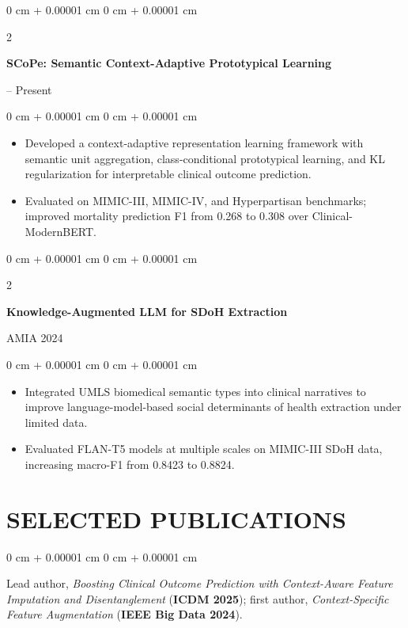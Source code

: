 \documentclass[10pt, letterpaper]{article}
\newenvironment{highlights}{
    \begin{itemize}[
        topsep=0.03 cm,
        parsep=0.03 cm,
        partopsep=0pt,
        itemsep=0pt,
        leftmargin=0 cm + 10pt
    ]
}{
    \end{itemize}
} %
\newenvironment{onecolentry}{
    \begin{adjustwidth}{
        0 cm + 0.00001 cm
    }{
        0 cm + 0.00001 cm
    }
}{
    \end{adjustwidth}
} %
\newenvironment{twocolentry}[2][]{
    \onecolentry
    \def\secondColumn{#2}
    \setcolumnwidth{\fill, 4.5 cm}
    \begin{paracol}{2}
}{
    \switchcolumn \raggedleft \secondColumn
    \end{paracol}
    \endonecolentry
} %
\begin{document}
\begin{twocolentry}{2026 -- Present}
\textbf{SCoPe: Semantic Context-Adaptive Prototypical Learning}
\end{twocolentry}
\begin{onecolentry}
\begin{highlights}
\item Developed a context-adaptive representation learning framework with semantic unit aggregation, class-conditional prototypical learning, and KL regularization for interpretable clinical outcome prediction.
\item Evaluated on MIMIC-III, MIMIC-IV, and Hyperpartisan benchmarks; improved mortality prediction F1 from 0.268 to 0.308 over Clinical-ModernBERT.
\end{highlights}
\end{onecolentry}
\vspace{0.06 cm}

\begin{twocolentry}{AMIA 2024}
\textbf{Knowledge-Augmented LLM for SDoH Extraction}
\end{twocolentry}
\begin{onecolentry}
\begin{highlights}
\item Integrated UMLS biomedical semantic types into clinical narratives to improve language-model-based social determinants of health extraction under limited data.
\item Evaluated FLAN-T5 models at multiple scales on MIMIC-III SDoH data, increasing macro-F1 from 0.8423 to 0.8824.
\end{highlights}
\end{onecolentry}
\vspace{0.06 cm}
\section{SELECTED PUBLICATIONS}
\begin{onecolentry}
Lead author, \textit{Boosting Clinical Outcome Prediction with Context-Aware Feature Imputation and Disentanglement} (\textbf{ICDM 2025}); first author, \textit{Context-Specific Feature Augmentation} (\textbf{IEEE Big Data 2024}).
\end{onecolentry}
\end{document}
